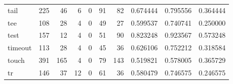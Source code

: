 \begin{longtable}{lrrrrrrrrr}
tail      &                                                225 &                                                 46 &                                                  6 &                                                  0 &                                                 91 &                                                 82 &                                           0.674444 &                               0.795556 &                             0.364444 \\
tee       &                                                108 &                                                 28 &                                                  4 &                                                  0 &                                                 49 &                                                 27 &                                           0.599537 &                               0.740741 &                             0.250000 \\
test      &                                                157 &                                                 12 &                                                  4 &                                                  0 &                                                 51 &                                                 90 &                                           0.823248 &                               0.923567 &                             0.573248 \\
timeout   &                                                113 &                                                 28 &                                                  4 &                                                  0 &                                                 45 &                                                 36 &                                           0.626106 &                               0.752212 &                             0.318584 \\
touch     &                                                391 &                                                165 &                                                  4 &                                                  0 &                                                 79 &                                                143 &                                           0.519821 &                               0.578005 &                             0.365729 \\
tr        &                                                146 &                                                 37 &                                                 12 &                                                  0 &                                                 61 &                                                 36 &                                           0.580479 &                               0.746575 &                             0.246575 \\

\end{longtable}

